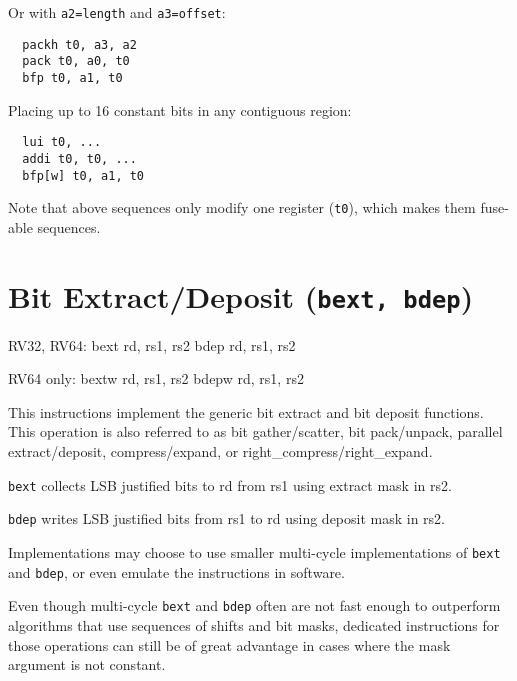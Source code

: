 Or with {\tt a2=length} and {\tt a3=offset}:

\begin{minipage}{\linewidth}
\begin{verbatim}
  packh t0, a3, a2
  pack t0, a0, t0
  bfp t0, a1, t0
\end{verbatim}
\end{minipage}

Placing up to 16 constant bits in any contiguous region:

\begin{minipage}{\linewidth}
\begin{verbatim}
  lui t0, ...
  addi t0, t0, ...
  bfp[w] t0, a1, t0
\end{verbatim}
\end{minipage}

Note that above sequences only modify one register ({\tt t0}), which makes them
fuse-able sequences.


\section{Bit Extract/Deposit (\texttt{bext,\ bdep})}

\begin{rvb}
  RV32, RV64:
    bext rd, rs1, rs2
    bdep rd, rs1, rs2

  RV64 only:
    bextw rd, rs1, rs2
    bdepw rd, rs1, rs2
\end{rvb}

This instructions implement the generic bit extract and bit deposit functions.
This operation is also referred to as bit gather/scatter, bit pack/unpack,
parallel extract/deposit, compress/expand, or right\_compress/right\_expand.

\texttt{bext} collects LSB justified bits to rd from rs1 using extract mask in rs2.

\texttt{bdep} writes LSB justified bits from rs1 to rd using deposit mask in rs2.



Implementations may choose to use smaller multi-cycle implementations of
\texttt{bext} and \texttt{bdep}, or even emulate the instructions in software.

Even though multi-cycle \texttt{bext} and \texttt{bdep} often are not fast
enough to outperform algorithms that use sequences of shifts and bit masks,
dedicated instructions for those operations can still be of great advantage in
cases where the mask argument is not constant.

